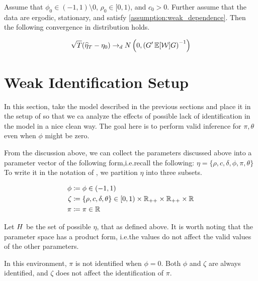 \documentclass[11pt, letterpaper, twoside, final]{article}
\begin{document}
\begin{theorem}
    Assume that $\phi_0  \in (-1,1) \setminus 0$, $\rho_0 \in [0,1)$, and $c_0 > 0$. 
    Further assume that the data are ergodic, stationary, and satisfy \cref{assumption:weak_dependence}.
    Then the following convergence in distribution holds.

    \begin{equation}
    \sqrt{T} (\widehat{\eta}_T - \eta_0) \to_d N\left(0, \left(G' \operatorname{\mathbb{E}}[\mathcal{W}] G\right)^{-1}\right)
    \end{equation}
\end{theorem}





\section{Weak Identification Setup}

In this section, take the model described in the previous sections and place it in the setup of
\textcite{andrews2014Gmm} so that we ca analyze the effects of possible lack of identification in the model in a
nice clean way.
The goal here is to perform valid inference for $\pi, \theta$ even when $\phi$ might be zero. 


From the discussion above, we can collect the parameters discussed above into a parameter vector of the following
form,i.e.\@ recall the following: $\eta = \lbrace \rho, c, \delta, \phi, \pi, \theta \rbrace$
To write it in the notation of \textcite{andrews2014Gmm}, we partition $\eta$ into three subsets.

\begin{align}
    \phi &\coloneqq \phi  \in (-1, 1) \\ 
    \zeta &\coloneqq \lbrace \rho, c, \delta, \theta \rbrace \in [0,1) \times \mathbb{R}_{++} \times \mathbb{R}_{++} \times
    \mathbb{R}  \\
    \pi &\coloneqq \pi \in \mathbb{R} 
\end{align}

Let $H$ be the set of possible $\eta$, that as defined above.
It is worth noting that the parameter space has a product form, i.e.\@ the values do not affect the valid values
of the other parameters.

In this environment, $\pi$ is not identified when $\phi = 0$.
Both $\phi$ and $\zeta$ are always identified, and $\zeta$ does not affect the identification of $\pi$.
\end{document}
